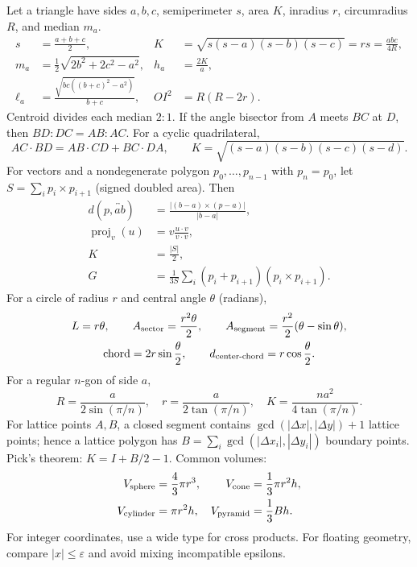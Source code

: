 \begingroup\small
Let a triangle have sides $a,b,c$, semiperimeter $s$, area $K$, inradius
$r$, circumradius $R$, and median $m_a$.
\begin{align*}
 s&=\frac{a+b+c}{2}, &
 K&=\sqrt{s(s-a)(s-b)(s-c)}=rs=\frac{abc}{4R},\\
 m_a&=\frac12\sqrt{2b^2+2c^2-a^2}, &
 h_a&=\frac{2K}{a},\\
 \ell_a&=\frac{\sqrt{bc((b+c)^2-a^2)}}{b+c}, &
 OI^2&=R(R-2r).
\end{align*}
Centroid divides each median $2:1$. If the angle bisector from $A$ meets
$BC$ at $D$, then $BD:DC=AB:AC$. For a cyclic quadrilateral,
\[
 AC\cdot BD=AB\cdot CD+BC\cdot DA,\qquad
 K=\sqrt{(s-a)(s-b)(s-c)(s-d)}.
\]
For vectors and a nondegenerate polygon $p_0,\ldots,p_{n-1}$ with
$p_n=p_0$, let $S=\sum_i p_i\times p_{i+1}$ (signed doubled area). Then
\begin{align*}
 d(p,\overleftrightarrow{ab})
   &=\frac{|(b-a)\times(p-a)|}{|b-a|},\\
 \operatorname{proj}_{v}(u)&=v\frac{u\cdot v}{v\cdot v},\\
 K&=\frac{|S|}{2},\\
 G&=\frac1{3S}\sum_i(p_i+p_{i+1})(p_i\times p_{i+1}).
\end{align*}
For a circle of radius $r$ and central angle $\theta$ (radians),
\begin{gather*}
 L=r\theta,\qquad A_{\rm sector}=\frac{r^2\theta}{2},\qquad
 A_{\rm segment}=\frac{r^2}{2}(\theta-\sin\theta),\\
 \operatorname{chord}=2r\sin\frac\theta2,\qquad
 d_{\rm center\text{-}chord}=r\cos\frac\theta2.
\end{gather*}
For a regular $n$-gon of side $a$,
\[
 R=\frac{a}{2\sin(\pi/n)},\quad r=\frac{a}{2\tan(\pi/n)},\quad
 K=\frac{na^2}{4\tan(\pi/n)}.
\]
For lattice points $A,B$, a closed segment contains
$\gcd(|\Delta x|,|\Delta y|)+1$ lattice points; hence a lattice polygon has
$B=\sum_i\gcd(|\Delta x_i|,|\Delta y_i|)$ boundary points. Pick's theorem:
$K=I+B/2-1$. Common volumes:
\begin{align*}
 V_{\rm sphere}&=\frac43\pi r^3, & V_{\rm cone}&=\frac13\pi r^2h,\\
 V_{\rm cylinder}&=\pi r^2h, & V_{\rm pyramid}&=\frac13Bh.
\end{align*}
For integer coordinates, use a wide type for cross products. For floating
geometry, compare $|x|\le\varepsilon$ and avoid mixing incompatible epsilons.
\endgroup
